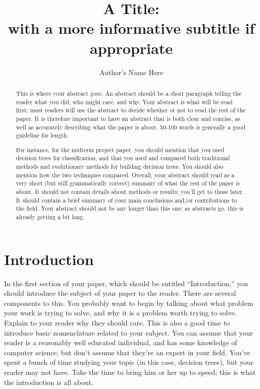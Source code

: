 \documentclass[12pt, letterpaper]{article}
\title{A Title: \\ with a more informative subtitle if appropriate}
\author{Author's Name Here}
\begin{document}
\maketitle

\begin{abstract}
This is where your abstract goes.  An abstract should be a short paragraph
telling the reader what you did, who might care, and why.  Your abstract is what
will be read first; most readers will use the abstract to decide whether or not
to read the rest of the paper.  It is therefore important to have an abstract
that is both clear and concise, as well as accurately describing what the paper
is about.  50-100 words is generally a good guideline for length.

For instance, for the midterm project paper, you should mention that you used
decision trees for classification, and that you used and compared both
traditional methods and evolutionary methods for building decision trees.  You
should also mention how the two techniques compared.  Overall, your abstract
should read as a very short (but still grammatically correct) summary of what
the rest of the paper is about.  It should not contain details about methods or
results; you'll get to those later.  It should contain a brief summary of your
main conclusions and/or contributions to the field. Your abstract should not be
any longer than this one; as abstracts go, this is already getting a bit long.

\end{abstract}

\section{Introduction}
In the first section of your paper, which should be entitled ``Introduction,''
you should introduce the subject of your paper to the reader.  There are several
components to this.  You probably want to begin by talking about what problem
your work is trying to solve, and why it is a problem worth trying to solve.
Explain to your reader why they should care.  This is also a good time to
introduce basic nomenclature related to your subject.  You can assume that your
reader is a reasonably well educated individual, and has some knowledge of
computer science, but don't assume that they're an expert in your field.  You've
spent a bunch of time studying your topic (in this case, decision trees), but
your reader may not have.  Take the time to bring him or her up to speed; this
is what the introduction is all about.
\end{document}
